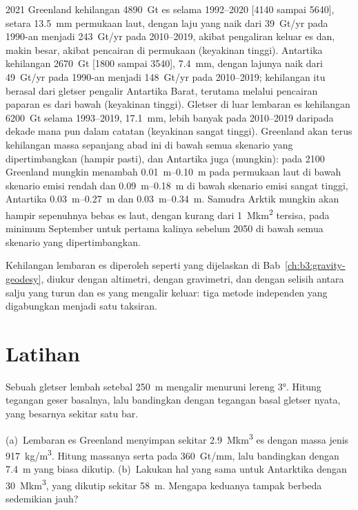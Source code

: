 \begin{dated}{2021}
Greenland kehilangan \qty{4890}{Gt} es selama 1992--2020 [4140 sampai 5640],
setara \qty{13.5}{mm} permukaan laut, dengan laju yang naik dari \qty{39}{Gt/yr} pada
1990-an menjadi \qty{243}{Gt/yr} pada 2010--2019, akibat pengaliran keluar es dan, makin besar,
akibat pencairan di permukaan (keyakinan tinggi). Antartika kehilangan \qty{2670}{Gt}
[1800 sampai 3540], \qty{7.4}{mm}, dengan lajunya naik dari \qty{49}{Gt/yr} pada
1990-an menjadi \qty{148}{Gt/yr} pada 2010--2019; kehilangan itu berasal dari gletser pengalir Antartika Barat,
terutama melalui pencairan paparan es dari bawah (keyakinan
tinggi). Gletser di luar lembaran es kehilangan \qty{6200}{Gt} selama
1993--2019, \qty{17.1}{mm}, lebih banyak pada 2010--2019 daripada dekade mana pun
dalam catatan (keyakinan sangat tinggi). Greenland akan terus kehilangan massa
sepanjang abad ini di bawah semua skenario yang dipertimbangkan (hampir
pasti), dan Antartika juga (mungkin): pada 2100 Greenland mungkin menambah
\qtyrange{0.01}{0.10}{m} pada permukaan laut di bawah skenario emisi rendah
dan \qtyrange{0.09}{0.18}{m} di bawah skenario emisi sangat tinggi, Antartika
\qtyrange{0.03}{0.27}{m} dan \qtyrange{0.03}{0.34}{m}. Samudra Arktik
mungkin akan hampir sepenuhnya bebas es laut, dengan kurang dari
\qty{1}{\mega km^2} tersisa, pada minimum September untuk pertama kalinya
sebelum 2050 di bawah semua skenario yang dipertimbangkan.
\end{dated}

Kehilangan lembaran es diperoleh seperti yang dijelaskan di Bab~\ref{ch:b3:gravity-geodesy},
diukur dengan altimetri, dengan gravimetri, dan dengan selisih antara salju yang turun
dan es yang mengalir keluar: tiga metode independen yang digabungkan
menjadi satu taksiran.

\section{Latihan}

\begin{exercise}[$\star$]\label{exo:b3:glaciology:1}
Sebuah gletser lembah setebal \qty{250}{m} mengalir menuruni lereng \ang{3}. Hitung
tegangan geser basalnya, lalu bandingkan dengan tegangan basal gletser nyata,
yang besarnya sekitar satu bar.
\end{exercise}

\begin{exercise}[$\star$]\label{exo:b3:glaciology:2}
(a)~Lembaran es Greenland menyimpan sekitar \qty{2.9}{\mega km^3} es dengan
massa jenis \qty{917}{kg/m^3}. Hitung massanya serta  pada
\qty{360}{Gt/mm}, lalu bandingkan dengan \qty{7.4}{m} yang biasa dikutip.
(b)~Lakukan hal yang sama untuk Antarktika dengan \qty{30}{\mega km^3}, yang dikutip sekitar
\qty{58}{m}. Mengapa keduanya tampak berbeda sedemikian jauh?
\end{exercise}

